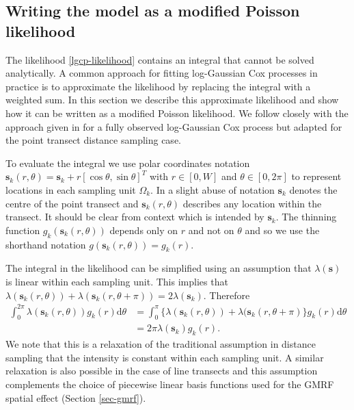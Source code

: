 \documentclass{stylefile16/statsoc}
\newcommand{\bs}{\mathbf{s}}
\begin{document}
\subsection{Writing the model as a modified Poisson likelihood}

\sloppy The likelihood \eqref{lgcp-likelihood} contains an integral that cannot be solved analytically.  A common approach for fitting log-Gaussian Cox processes in practice is to approximate the likelihood by replacing the integral with a weighted sum.  In this section we describe this approximate likelihood and show how it can be written as a modified Poisson likelihood.  We follow closely with the approach given in \cite{simpson_going_2016} for a fully observed log-Gaussian Cox process but adapted for the point transect distance sampling case.

To evaluate the integral we use polar coordinates notation $\bs_k(r, \theta) = \bs_k + r\left[\cos\theta, \sin\theta \right]^T$ with $r \in [0, W]$ and $\theta \in [0, 2\pi]$ to represent locations in each sampling unit $\Omega_k$.  In a slight abuse of notation $\bs_k$ denotes the centre of the point transect and $\bs_k(r,\theta)$ describes any location within the transect.  It should be clear from context which is intended by $\bs_k$.   The thinning function $g_k(\bs_k(r, \theta))$ depends only on $r$ and not on $\theta$ and so we use the shorthand notation $ g(\bs_k(r, \theta)) = g_k(r)$. 

The integral in the likelihood can be simplified using an assumption that $\lambda(\bs)$ is linear within each sampling unit.  This implies that $\lambda(\bs_k(r, \theta)) + \lambda(\bs_k(r, \theta + \pi)) = 2\lambda(\bs_k)$.  Therefore
\begin{align}
\label{eq-linear-intensity}
	\int_0^{2\pi} \lambda(\bs_k(r, \theta))g_k(r)\mathrm{d}\theta &= \int_0^\pi \{\lambda(\bs_k(r, \theta)) + \lambda(\bs_k(r, \theta + \pi) \} g_k(r)\mathrm{d}\theta \nonumber \\
	&= 2\pi \lambda(\bs_k)g_k(r).
\end{align}
We note that this is a relaxation of the traditional assumption in distance sampling that the intensity is constant within each sampling unit.  A similar relaxation is also possible in the case of line transects \citep{yuan_point_2017} and this assumption complements the choice of piecewise linear basis functions used for the GMRF spatial effect (Section \ref{sec-gmrf}).  
\end{document}
